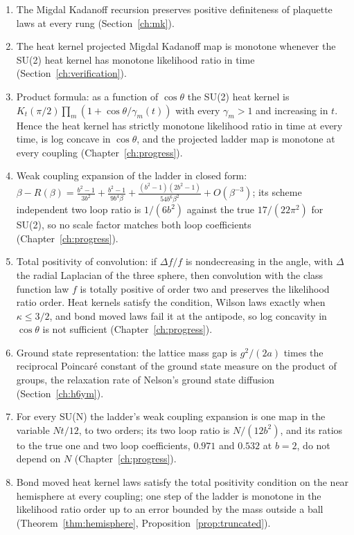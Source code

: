 \begin{enumerate}
\item The Migdal Kadanoff recursion preserves positive definiteness of plaquette laws at every rung (Section~\ref{ch:mk}).
\item The heat kernel projected Migdal Kadanoff map is monotone whenever the SU(2) heat kernel has monotone likelihood ratio in time (Section~\ref{ch:verification}).
\item Product formula: as a function of $\cos\theta$ the SU(2) heat kernel is $K_t(\pi/2)\prod_m(1+\cos\theta/\gamma_m(t))$ with every $\gamma_m>1$ and increasing in $t$. Hence the heat kernel has strictly monotone likelihood ratio in time at every time, is log concave in $\cos\theta$, and the projected ladder map is monotone at every coupling (Chapter~\ref{ch:progress}).
\item Weak coupling expansion of the ladder in closed form: $\beta-R(\beta)=\frac{b^2-1}{3b^2}+\frac{b^2-1}{9b^4\beta}+\frac{(b^2-1)(2b^2-1)}{54b^6\beta^2}+O(\beta^{-3})$; its scheme independent two loop ratio is $1/(6b^2)$ against the true $17/(22\pi^2)$ for SU(2), so no scale factor matches both loop coefficients (Chapter~\ref{ch:progress}).
\item Total positivity of convolution: if $\Delta f/f$ is nondecreasing in the angle, with $\Delta$ the radial Laplacian of the three sphere, then convolution with the class function law $f$ is totally positive of order two and preserves the likelihood ratio order. Heat kernels satisfy the condition, Wilson laws exactly when $\kappa\le3/2$, and bond moved laws fail it at the antipode, so log concavity in $\cos\theta$ is not sufficient (Chapter~\ref{ch:progress}).
\item Ground state representation: the lattice mass gap is $g^2/(2a)$ times the reciprocal Poincar\'e constant of the ground state measure on the product of groups, the relaxation rate of Nelson's ground state diffusion (Section~\ref{ch:h6ym}).
\item For every SU(N) the ladder's weak coupling expansion is one map in the variable $Nt/12$, to two orders; its two loop ratio is $N/(12b^2)$, and its ratios to the true one and two loop coefficients, $0.971$ and $0.532$ at $b=2$, do not depend on $N$ (Chapter~\ref{ch:progress}).
\item Bond moved heat kernel laws satisfy the total positivity condition on the near hemisphere at every coupling; one step of the ladder is monotone in the likelihood ratio order up to an error bounded by the mass outside a ball (Theorem~\ref{thm:hemisphere}, Proposition~\ref{prop:truncated}).

\end{enumerate}

